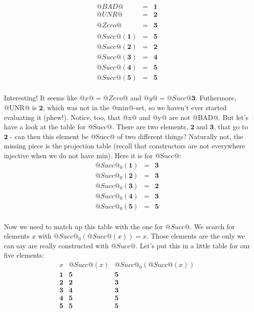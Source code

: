 \[\begin{array}{lcl}
@BAD@ & = & \mathbf{1} \\
@UNR@ & = & \mathbf{2} \\
\\
@Zero@ & = & \mathbf{3} \\
\\
@Succ@(\mathbf{1}) & = & \mathbf{5} \\
@Succ@(\mathbf{2}) & = & \mathbf{2} \\
@Succ@(\mathbf{3}) & = & \mathbf{4} \\
@Succ@(\mathbf{4}) & = & \mathbf{5} \\
@Succ@(\mathbf{5}) & = & \mathbf{5} \\
\end{array}\]

Interesting! It seems like $@x@ = @Zero@$ and $@y@ = @Succ @\mathbf{3}$.
Futhermore, @UNR@ is $\mathbf{2}$, which was not in the @min@-set, so
we haven't ever started evaluating it (phew!). Notice, too, that @x@
and @y@ are not @BAD@. But let's have a look at the table for
@Succ@. There are two elements, $\mathbf{2}$ and $\mathbf{3}$, that go
to $\mathbf{2}$ - can then this element be @Succ@ of two different
things? Naturally not, the missing piece is the projection table
(recall that constructors are not everywhere injective when we do not
have min). Here it is for @Succ@:
\[\begin{array}{lcl}
@Succ@_0(\mathbf{1}) & = & \mathbf{3} \\
@Succ@_0(\mathbf{2}) & = & \mathbf{3} \\
@Succ@_0(\mathbf{3}) & = & \mathbf{2} \\
@Succ@_0(\mathbf{4}) & = & \mathbf{3} \\
@Succ@_0(\mathbf{5}) & = & \mathbf{5} \\
\end{array}\]

Now we need to match up this table with the one for $@Succ@$. We
search for elements $x$ with $@Succ@_0(@Succ@(x)) = x$. Those
elements are the only we can say are really constructed with $@Succ@$.
Let's put this in a little table for our five elements:
\[\begin{array}{ccc}
x          & @Succ@(x)  & @Succ@_0(@Succ@(x)) \\
\mathbf{1} & \mathbf{5} & \mathbf{5} \\
\mathbf{2} & \mathbf{2} & \mathbf{3} \\
\mathbf{3} & \mathbf{4} & \mathbf{3} \\
\mathbf{4} & \mathbf{5} & \mathbf{5} \\
\mathbf{5} & \mathbf{5} & \mathbf{5} \\
\end{array}\]

